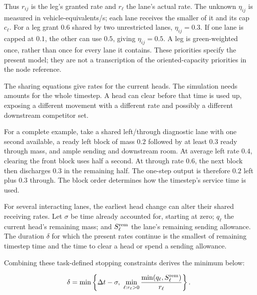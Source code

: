 \documentclass[10pt,a4paper]{article}
\begin{document}
Thus $r_{ij}$ is the leg's granted rate and $r_\ell$ the lane's actual
rate. The unknown $\eta_{ij}$ is measured in vehicle-equivalents/s; each
lane receives the smaller of it and its cap $c_\ell$. For a leg grant
$0.6$ shared by two unrestricted lanes, $\eta_{ij}=0.3$. If one lane is
capped at $0.1$, the other can use $0.5$, giving $\eta_{ij}=0.5$.
A leg is green-weighted once, rather than once for every lane it contains.
These priorities specify the present model; they are not a transcription
of the oriented-capacity priorities in the node reference.

The sharing equations give rates for the current heads. The simulation
needs amounts for the whole timestep. A head can clear before that time
is used up, exposing a different movement with a different rate and
possibly a different downstream competitor set.

For a complete example, take a shared left/through diagnostic lane with
one second available, a ready left block of mass $0.2$ followed by at
least $0.3$ ready through mass, and ample sending and downstream room.
At average left rate $0.4$, clearing the front block uses half a second.
At through rate $0.6$, the next block then discharges $0.3$ in the remaining
half. The one-step output is therefore $0.2$ left plus $0.3$ through.
The block order determines how the timestep's service time is used.

For several interacting lanes, the earliest head change can alter their
shared receiving rates. Let $\sigma$ be time already accounted for, starting
at zero; $q_\ell$ the current head's remaining mass; and
$S_\ell^{\rm rem}$ the lane's remaining sending allowance. The duration
$\delta$ for which the present rates continue is the smallest of remaining
timestep time and the time to clear a head or spend a sending allowance.
\par\begin{samepage}
Combining these task-defined stopping constraints derives the minimum below:
\par
\begin{equation}
 \delta=\min\left\{\Delta t-\sigma,\
 \min_{\ell:r_\ell>0}
       \frac{\min(q_\ell,S_\ell^{\rm rem})}{r_\ell}\right\}.
 \label{eq:compact-head-time}
\end{equation}
\par\end{samepage}
\end{document}
